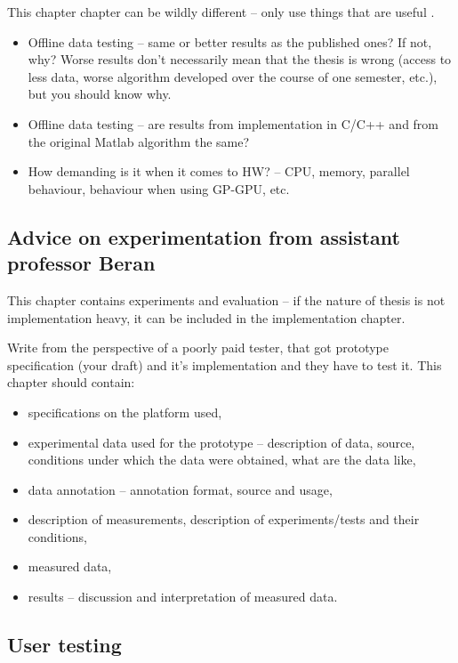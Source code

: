 {{This chapter chapter can be wildly different -- only use things that are useful \cite{Cernocky}.
\begin{itemize}
  \item{Offline data testing -- same or better results as the published ones? If not, why? Worse results don't necessarily mean that the thesis is wrong (access to less data, worse algorithm developed over the course of one semester, etc.), but you should know why.}
  \item{Offline data testing -- are results from implementation in C/C++ and from the original Matlab algorithm the same?}
  \item{How demanding is it when it comes to HW? -- CPU, memory, parallel behaviour, behaviour when using GP-GPU, etc.}
\end{itemize}

\subsection*{Advice on experimentation from assistant professor Beran}
This chapter contains experiments and evaluation -- if the nature of thesis is not implementation heavy, it can be included in the implementation chapter.

Write from the perspective of a poorly paid tester, that got prototype specification (your draft) and it's implementation and they have to test it. This chapter should contain:
\begin{itemize}
  \item{specifications on the platform used,}
  \item{experimental data used for the prototype -- description of data, source, conditions under which the data were obtained, what are the data like,}
  \item{data annotation -- annotation format, source and usage,}
  \item{description of measurements, description of experiments/tests and their conditions,}
  \item{measured data,}
  \item{results -- discussion and interpretation of measured data.}
\end{itemize}

\subsection*{User testing}

}}
